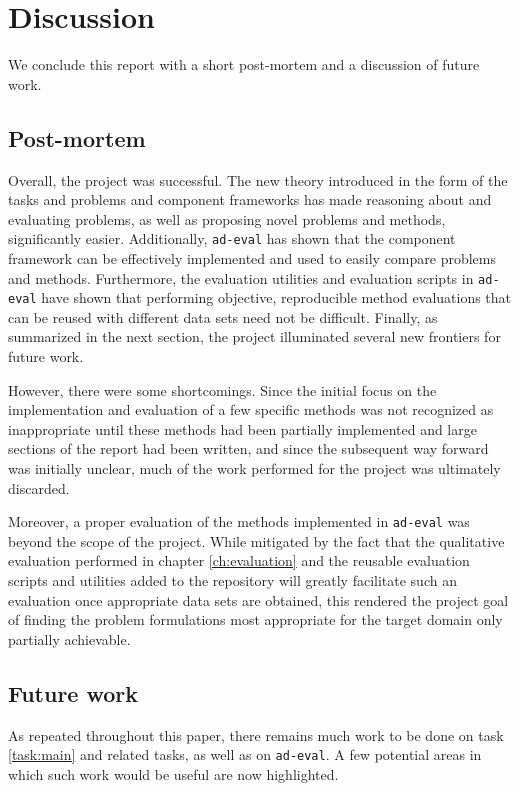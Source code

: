 \chapter{Discussion}
\label{ch:discussion}

We conclude this report with a short post-mortem and a discussion of future work.

\section{Post-mortem}

Overall, the project was successful. The new theory introduced in the form of the tasks and problems and component frameworks has made reasoning about and evaluating problems, as well as proposing novel problems and methods, significantly easier. Additionally, \texttt{ad-eval} has shown that the component framework can be effectively implemented and used to easily compare problems and methods. Furthermore, the evaluation utilities and evaluation scripts in \texttt{ad-eval} have shown that performing objective, reproducible method evaluations that can be reused with different data sets need not be difficult. Finally, as summarized in the next section, the project illuminated several new frontiers for future work.

However, there were some shortcomings. Since the initial focus on the implementation and evaluation of a few specific methods was not recognized as inappropriate until these methods had been partially implemented and large sections of the report had been written, and since the subsequent way forward was initially unclear, much of the work performed for the project was ultimately discarded.

Moreover, a proper evaluation of the methods implemented in \texttt{ad-eval} was beyond the scope of the project. While mitigated by the fact that the qualitative evaluation performed in chapter \ref{ch:evaluation} and the reusable evaluation scripts and utilities added to the repository will greatly facilitate such an evaluation once appropriate data sets are obtained, this rendered the project goal of finding the problem formulations most appropriate for the target domain only partially achievable.

\section{Future work}

As repeated throughout this paper, there remains much work to be done on task \ref{task:main} and related tasks, as well as on \texttt{ad-eval}. A few potential areas in which such work would be useful are now highlighted.

